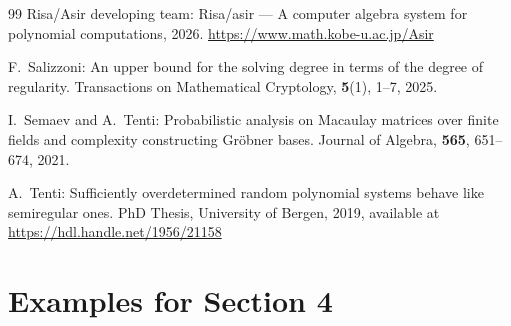 \documentclass{article}
\theoremstyle{definition}
\theoremstyle{plain}
\theoremstyle{plain}
\theoremstyle{plain}
\theoremstyle{plain}
\numberwithin{equation}{subsection}
\begin{document}
\begin{thebibliography}{99}
Risa/Asir developing team:
Risa/asir — A computer algebra system for polynomial computations, 2026.
\url{https://www.math.kobe-u.ac.jp/Asir}


F.\ Salizzoni:
An upper bound for the solving degree in terms of the degree of regularity.
Transactions on Mathematical Cryptology, \textbf{5}(1), 1--7, 2025.

I.\ Semaev and A.\ Tenti:
Probabilistic analysis on Macaulay matrices over finite fields and 
complexity constructing Gr\"obner bases.
Journal of Algebra, {\bf 565}, 651--674, 2021. 

A.\ Tenti:
Sufficiently overdetermined random polynomial systems behave like semiregular ones.
PhD Thesis, University of Bergen, 2019, available at \url{https://hdl.handle.net/1956/21158}






\end{thebibliography}

\renewcommand{\baselinestretch}{1} 
\appendix
\def\thesection{Appendix \Alph{section}}


\def\thesection{Appendix \Alph{section}}
\section{Examples for Section 4}\label{app:example}
\end{document}
